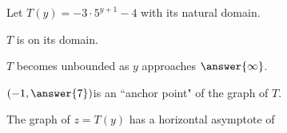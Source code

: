 \documentclass{ximera}
\author{Lee Wayand}
\begin{document}
\begin{exercise}




Let $T(y) = -3 \cdot 5^{y+1} - 4$ with its natural domain.


\begin{question}


$T$ is  on its domain. \\


\end{question}







\begin{question}


$T$ becomes unbounded as $y$ approaches $\answer{\infty}$.


\end{question}





\begin{question}


$\left( -1, \answer{7} \right) $is an ``anchor point" of the graph of $T$. \\


\end{question}








\begin{question}


The graph of $z=T(y)$ has a horizontal asymptote of

\begin{multipleChoice}
\end{multipleChoice}


\end{question}








\end{exercise}
\end{document}
